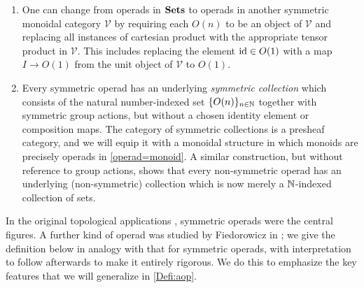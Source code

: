 \begin{rem}
\begin{enumerate}
\item One can change from operads in $\mathbf{Sets}$ to operads in another symmetric monoidal category $\mathcal{V}$ by requiring each $O(n)$ to be an object of $\mathcal{V}$ and replacing all instances of cartesian product with the appropriate tensor product in $\mathcal{V}$. This includes replacing the element $\textrm{id} \in O(1)$ with a map $I \rightarrow O(1)$ from the unit object of $\mathcal{V}$ to $O(1)$.
\item Every symmetric operad has an underlying \textit{symmetric collection} which consists of the natural number-indexed set $\{ O(n) \}_{n \in \mathbb{N}}$ together with symmetric group actions, but without a chosen identity element or composition maps. The category of symmetric collections is a presheaf category, and we will equip it with a monoidal structure in which monoids are precisely operads in \cref{operad=monoid}. A similar construction, but without reference to group actions, shows that every non-symmetric operad has an underlying (non-symmetric) collection which is now merely a $\mathbb{N}$-indexed collection of sets.
\end{enumerate}
\end{rem}

\begin{example}\label{ex:non-sym}
\end{example}


In the original topological applications \cite{maygeom}, symmetric operads were the central figures. A further kind of operad was studied by Fiedorowicz in \cite{fie-br}; we give the definition below in analogy with that for symmetric operads, with interpretation to follow afterwards to make it entirely rigorous. We do this to emphasize the key features that we will generalize in \cref{Defi:aop}.

